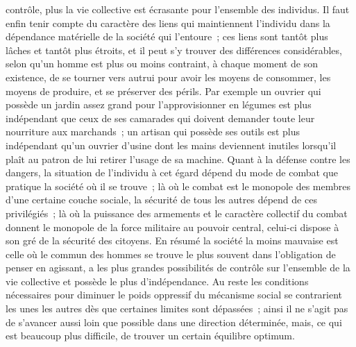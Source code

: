 \documentclass[french,twoside]{book} %
\begin{document}
contrôle, plus la vie collective est écrasante pour l'ensemble des individus. Il faut enfin tenir compte du caractère des liens qui maintiennent l'individu dans la dépendance matérielle de la société qui l'entoure ; ces liens sont tantôt plus lâches et tantôt plus étroits, et il peut s'y trouver des différences considérables, selon qu'un homme est plus ou moins contraint, à chaque moment de son existence, de se tourner vers autrui pour avoir les moyens de consommer, les moyens de produire, et se préserver des périls. Par exemple un ouvrier qui possède un jardin assez grand pour l'approvisionner en légumes est plus indépendant que ceux de ses camarades qui doivent demander toute leur nourriture aux marchands ; un artisan qui possède ses outils est plus indépendant qu'un ouvrier d'usine dont les mains deviennent inutiles lorsqu'il plaît au patron de lui retirer l'usage de sa machine. Quant à la défense contre les dangers, la situation de l'individu à cet égard dépend du mode de combat que pratique la société où il se trouve ; là où le combat est le monopole des membres d'une certaine couche sociale, la sécurité de tous les autres dépend de ces privilégiés ; là où la puissance des armements et le caractère collectif du combat donnent le monopole de la force militaire au pouvoir central, celui-ci dispose à son gré de la sécurité des citoyens. En résumé la société la moins mauvaise est celle où le commun des hommes se trouve le plus souvent dans l'obligation de penser en agissant, a les plus grandes possibilités de contrôle sur l'ensemble de la vie collective et possède le plus d'indépendance. Au reste les conditions nécessaires pour diminuer le poids oppressif du mécanisme social se contrarient les unes les autres dès que certaines limites sont dépassées ; ainsi il ne s'agit pas de s'avancer aussi loin que possible dans une direction déterminée, mais, ce qui est beaucoup plus difficile, de trouver un certain équilibre optimum.\par
\end{document}
